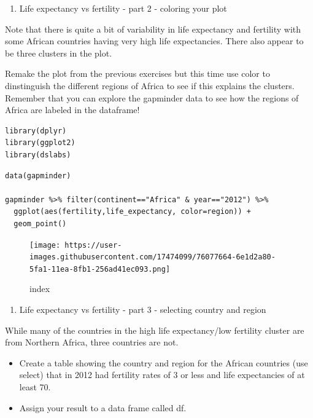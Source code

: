\documentclass[
]{article}
\providecommand{\tightlist}{%
  \setlength{\itemsep}{0pt}\setlength{\parskip}{0pt}}
\begin{document}
\begin{enumerate}
\def\labelenumi{\arabic{enumi}.}
\setcounter{enumi}{1}
\tightlist
\item
  Life expectancy vs fertility - part 2 - coloring your plot
\end{enumerate}

Note that there is quite a bit of variability in life expectancy and
fertility with some African countries having very high life
expectancies. There also appear to be three clusters in the plot.

Remake the plot from the previous exercises but this time use color to
dinstinguish the different regions of Africa to see if this explains the
clusters. Remember that you can explore the gapminder data to see how
the regions of Africa are labeled in the dataframe!

\begin{verbatim}
library(dplyr)
library(ggplot2)
library(dslabs)
\end{verbatim}

\begin{verbatim}
data(gapminder)

gapminder %>% filter(continent=="Africa" & year=="2012") %>%
  ggplot(aes(fertility,life_expectancy, color=region)) +
  geom_point()
\end{verbatim}

\begin{figure}
\centering
\texttt{[image: https://user-images.githubusercontent.com/17474099/76077664-6e1d2a80-5fa1-11ea-8fb1-256ad41ec093.png]}
\caption{index}
\end{figure}

\begin{enumerate}
\def\labelenumi{\arabic{enumi}.}
\setcounter{enumi}{2}
\tightlist
\item
  Life expectancy vs fertility - part 3 - selecting country and region
\end{enumerate}

While many of the countries in the high life expectancy/low fertility
cluster are from Northern Africa, three countries are not.

\begin{itemize}
\tightlist
\item
  Create a table showing the country and region for the African
  countries (use select) that in 2012 had fertility rates of 3 or less
  and life expectancies of at least 70.
\item
  Assign your result to a data frame called df.
\end{itemize}
\end{document}
